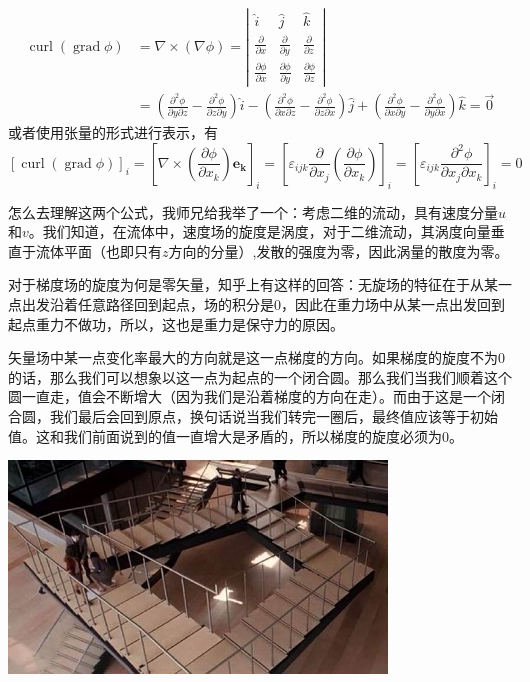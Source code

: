 \documentclass{ctexart}
\begin{document}
$$
\begin{aligned}
\operatorname{curl}(\operatorname{grad} \phi) &=\nabla \times(\nabla \phi) =\left|\begin{array}{lll}
\hat{i} & \hat{j} & \hat{k} \\
\frac{\partial}{\partial x} & \frac{\partial}{\partial y} & \frac{\partial}{\partial z} \\
\frac{\partial \phi}{\partial x} & \frac{\partial \phi}{\partial y} & \frac{\partial \phi}{\partial z}
\end{array}\right| \\
&=\left(\frac{\partial^{2} \phi}{\partial y \partial z}-\frac{\partial^{2} \phi}{\partial z \partial y}\right) \hat{i}-\left(\frac{\partial^{2} \phi}{\partial x \partial z}-\frac{\partial^{2} \phi}{\partial z \partial x}\right) \hat{j}+\left(\frac{\partial^{2} \phi}{\partial x \partial y}-\frac{\partial^{2} \phi}{\partial y \partial x}\right) \hat{k} =\overrightarrow{0}
\end{aligned}
$$
或者使用张量的形式进行表示，有
$$
 [\operatorname{curl}(\operatorname{grad} \phi)]_{i} =[\nabla \times (\frac{ \partial \phi}{ \partial x_{k} }) \boldsymbol{e_{k}} ]_{i} = 
  [ \varepsilon_{i j k} \frac{ \partial }{ \partial x_{j} }( \frac{ \partial \phi} { \partial x_{k} }) ]_{i} = [ \varepsilon_{i j k} \frac{ \partial^2 \phi}{ \partial x_{j} \partial x_{k} } ]_{i} =0
$$
\par
怎么去理解这两个公式，我师兄给我举了一个：考虑二维的流动，具有速度分量$u$和$v$。我们知道，在流体中，速度场的旋度是涡度，对于二维流动，其涡度向量垂直于流体平面（也即只有$z$方向的分量）,发散的强度为零，因此涡量的散度为零。
\par
对于梯度场的旋度为何是零矢量，知乎上有这样的回答：无旋场的特征在于从某一点出发沿着任意路径回到起点，场的积分是0，因此在重力场中从某一点出发回到起点重力不做功，所以，这也是重力是保守力的原因。
\par
矢量场中某一点变化率最大的方向就是这一点梯度的方向。如果梯度的旋度不为0的话，那么我们可以想象以这一点为起点的一个闭合圆。那么我们当我们顺着这个圆一直走，值会不断增大（因为我们是沿着梯度的方向在走）。而由于这是一个闭合圆，我们最后会回到原点，换句话说当我们转完一圈后，最终值应该等于初始值。这和我们前面说到的值一直增大是矛盾的，所以梯度的旋度必须为0。
     \begin{center}
        \includegraphics{rotation free.jpg}
    \end{center}
\end{document}
